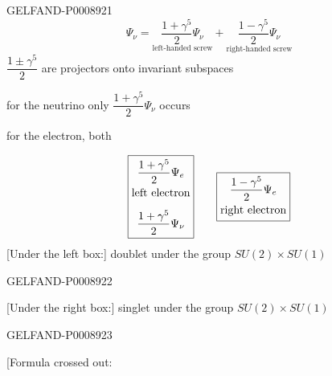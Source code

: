 \begin{GelfandAdjacentEvidence}{GELFAND-P000892}{1}
\[
\Psi_\nu=
\underset{\text{left-handed screw}}{\frac{1+\gamma^5}{2}\Psi_\nu}
+\underset{\text{right-handed screw}}{\frac{1-\gamma^5}{2}\Psi_\nu}
\]
$\dfrac{1\pm\gamma^5}{2}$ are projectors onto invariant subspaces

for the neutrino only $\dfrac{1+\gamma^5}{2}\Psi_\nu$ occurs

for the electron, both

\[
\begin{array}{c@{\qquad}c}
\fbox{$\begin{gathered}\dfrac{1+\gamma^5}{2}\Psi_e\\
\text{left electron}\\[6pt]
\dfrac{1+\gamma^5}{2}\Psi_\nu\end{gathered}$}
&
\fbox{$\begin{gathered}\dfrac{1-\gamma^5}{2}\Psi_e\\
\text{right electron}\end{gathered}$}
\end{array}
\]
[Under the left box:] doublet under the group $SU(2)\times SU(1)$
\end{GelfandAdjacentEvidence}
\begin{GelfandAdjacentEvidence}{GELFAND-P000892}{2}


[Under the right box:] singlet under the group $SU(2)\times SU(1)$
\end{GelfandAdjacentEvidence}
\begin{GelfandAdjacentEvidence}{GELFAND-P000892}{3}


[Formula crossed out: 
\end{GelfandAdjacentEvidence}
